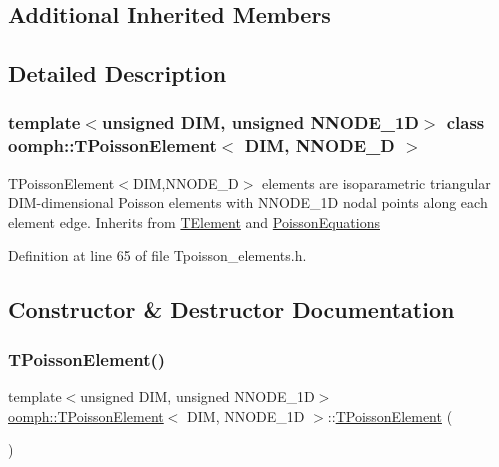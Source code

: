 \subsection*{Additional Inherited Members}


\subsection{Detailed Description}
\subsubsection*{template$<$unsigned D\+IM, unsigned N\+N\+O\+D\+E\+\_\+1D$>$\newline
class oomph\+::\+T\+Poisson\+Element$<$ D\+I\+M, N\+N\+O\+D\+E\+\_\+D $>$}

T\+Poisson\+Element$<$\+D\+I\+M,\+N\+N\+O\+D\+E\+\_\+D$>$ elements are isoparametric triangular D\+I\+M-\/dimensional Poisson elements with N\+N\+O\+D\+E\+\_\+1D nodal points along each element edge. Inherits from \hyperlink{classoomph_1_1TElement}{T\+Element} and \hyperlink{classoomph_1_1PoissonEquations}{Poisson\+Equations} 

Definition at line 65 of file Tpoisson\+\_\+elements.\+h.



\subsection{Constructor \& Destructor Documentation}
\mbox{\label{classoomph_1_1TPoissonElement_a63f38f2a34b1b9663eb3089423043243}} 
\subsubsection{\texorpdfstring{T\+Poisson\+Element()}{TPoissonElement()}\hspace{0.1cm}{\footnotesize\ttfamily [1/2]}}
{\footnotesize\ttfamily template$<$unsigned D\+IM, unsigned N\+N\+O\+D\+E\+\_\+1D$>$ \\
\hyperlink{classoomph_1_1TPoissonElement}{oomph\+::\+T\+Poisson\+Element}$<$ D\+IM, N\+N\+O\+D\+E\+\_\+1D $>$\+::\hyperlink{classoomph_1_1TPoissonElement}{T\+Poisson\+Element} (\begin{DoxyParamCaption}{ }\end{DoxyParamCaption})\hspace{0.3cm}{\ttfamily [inline]}}



